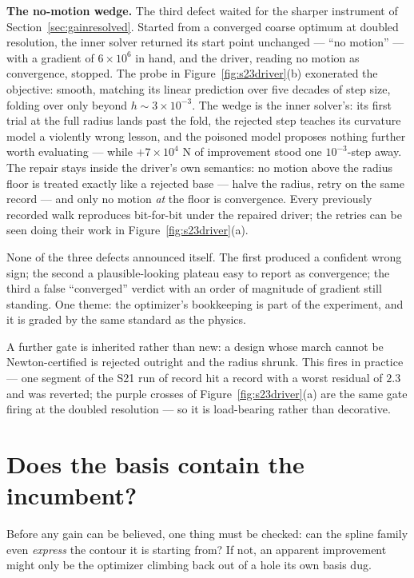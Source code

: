 \textbf{The no-motion wedge.} The third defect waited for the
sharper instrument of Section~\ref{sec:gainresolved}. Started from a
converged coarse optimum at doubled resolution, the inner solver
returned its start point unchanged --- ``no motion'' --- with a
gradient of $6\times10^{6}$ in hand, and the driver, reading no
motion as convergence, stopped. The probe in
Figure~\ref{fig:s23driver}(b) exonerated the objective: smooth,
matching its linear prediction over five decades of step size,
folding over only beyond $h \sim 3\times10^{-3}$. The wedge is the
inner solver's: its first trial at the full radius lands past the
fold, the rejected step teaches its curvature model a violently
wrong lesson, and the poisoned model proposes nothing further worth
evaluating --- while $+7\times10^{4}$ N of improvement stood one
$10^{-3}$-step away. The repair stays inside the driver's own
semantics: no motion above the radius floor is treated exactly like
a rejected base --- halve the radius, retry on the same record ---
and only no motion \emph{at} the floor is convergence. Every
previously recorded walk reproduces bit-for-bit under the repaired
driver; the retries can be seen doing their work in
Figure~\ref{fig:s23driver}(a).

None of the three defects announced itself. The first produced a
confident wrong sign; the second a plausible-looking plateau easy to
report as convergence; the third a false ``converged'' verdict with
an order of magnitude of gradient still standing. One theme: the
optimizer's bookkeeping is part of the experiment, and it is graded
by the same standard as the physics.

A further gate is inherited rather than new: a design whose march
cannot be Newton-certified is rejected outright and the radius
shrunk. This fires in practice --- one segment of the S21 run of
record hit a record with a worst residual of $2.3$ and was reverted;
the purple crosses of Figure~\ref{fig:s23driver}(a) are the same
gate firing at the doubled resolution --- so it is load-bearing
rather than decorative.

\section{Does the basis contain the incumbent?}
\label{sec:reprladder}

Before any gain can be believed, one thing must be checked: can the
spline family even \emph{express} the contour it is starting from? If
not, an apparent improvement might only be the optimizer climbing back
out of a hole its own basis dug.

